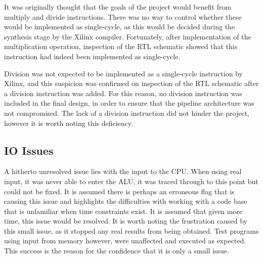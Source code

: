 It was originally thought that the goals of the project would benefit from
multiply and divide instructions. There was no way to control whether these
would be implemented as single-cycle, as this would be decided during the
synthesis stage by the Xilinx compiler. Fortunately, after implementation of the
multiplication operation, inspection of the RTL schematic showed that this
instruction had indeed been implemented as single-cycle.

Division was not expected to be implemented as a single-cycle instruction by
Xilinx, and this suspicion was confirmed on inspection of the RTL schematic
after a division instruction was added. For this reason, no division instruction
was included in the final design, in order to ensure that the pipeline
architecture was not compromised. The lack of a division instruction did not
hinder the project, however it is worth noting this deficiency.

\subsection{IO Issues}
A hitherto unresolved issue lies with the input to the CPU. When using real input,
it was never able to enter the ALU, it was traced through to this point but
could not be fixed. It is assumed there is perhaps an erroneous flag that is causing
this issue and highlights the difficulties with working with a code base that is 
unfamiliar when time constraints exist. It is assumed that given more time, this 
issue would be resolved. It is worth noting the frustration caused by this small
issue, as it stopped any real results from being obtained. Test programs using input
from memory however, were unaffected and executed as expected. This success is the 
reason for the confidence that it is only a small issue.
